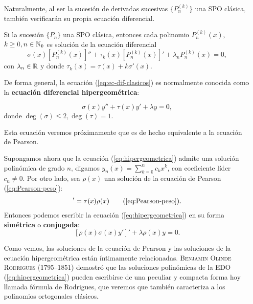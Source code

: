 Naturalmente, al ser la sucesión de derivadas sucesivas $\{P^{(k)}_n\}$ una SPO clásica, también verificarán su propia ecuación diferencial.

\begin{corolario}
    \label{cor:derivadas-k-hipergeometrica}
    Si la sucesión $\{P_n\}$ una SPO clásica, entonces cada polinomio $P^{(k)}_n(x)$, $k\geq 0, n\in\mathbb{N}_0$ es solución de la ecuación diferencial
    \begin{equation}
        \label{eq:ec-dif-der-suc}
        \sigma(x)[P_n^{(k)}(x)]'' + \tau_k(x)[P_n^{(k)}(x)]'+\lambda_n P^{(k)}_n(x) = 0,
    \end{equation}
    con $\lambda_n\in\mathbb{R}$ y donde $\tau_k(x)=\tau(x)+k\sigma'(x)$.
\end{corolario}

De forma general, la ecuación (\ref{eq:ec-dif-clasicos}) es normalmente conocida como la \textbf{ecuación diferencial hipergeométrica}:

\begin{equation}
    \label{eq:hipergeometrica}
    \sigma(x)y'' + \tau(x) y' + \lambda y = 0,
\end{equation}
donde $ \deg(\sigma)\leq 2, \deg(\tau)= 1$.

Esta ecuación veremos próximamente que es de hecho equivalente a la ecuación de Pearson. 

Supongamos ahora que la ecuación (\ref{eq:hipergeometrica}) admite una solución polinómica de grado $n$, digamos $y_n(x) = \sum_{k=0}^n c_k x^k$, con coeficiente líder $c_n\neq 0$. Por otro lado, sea $\rho(x)$ una solución de la ecuación de Pearson (\ref{eq:Pearson-peso}):
\begin{equation*}
    [\sigma(x)\rho(x)]'=\tau(x)\rho(x) \tag{\ref{eq:Pearson-peso}}.
\end{equation*}
Entonces podemos escribir la ecuación (\ref{eq:hipergeometrica}) en su forma \textbf{simétrica} o \textbf{conjugada}:
\begin{equation}
    \label{eq:hipergeometrica-conjugada}
    [\rho(x)\sigma(x)y']' + \lambda \rho(x) y = 0.
\end{equation}

Como vemos, las soluciones de la ecuación de Pearson y las soluciones de la ecuación hipergeométrica están íntimamente relacionadas. \textsc{Benjamin Olinde Rodrigues} (1795--1851) demostró que las soluciones polinómicas de la EDO (\ref{eq:hipergeometrica}) pueden escribirse de una peculiar y compacta forma hoy llamada fórmula de Rodrigues, que veremos que también caracteriza a los polinomios ortogonales clásicos.

